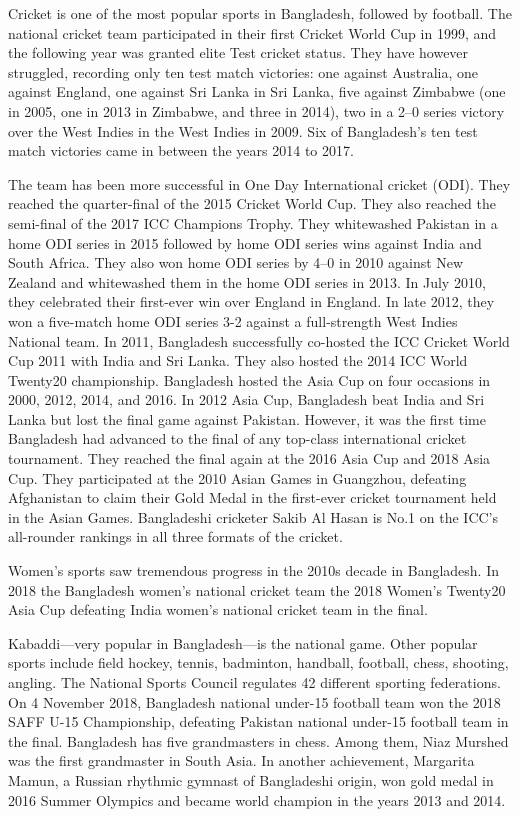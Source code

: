 Cricket is one of the most popular sports in Bangladesh, followed by
football. The national cricket team participated in their first Cricket
World Cup in 1999, and the following year was granted elite Test cricket
status. They have however struggled, recording only ten test match
victories: one against Australia, one against England, one against Sri
Lanka in Sri Lanka, five against Zimbabwe (one in 2005, one in 2013 in
Zimbabwe, and three in 2014), two in a 2--0 series victory over the West
Indies in the West Indies in 2009. Six of Bangladesh's ten test match
victories came in between the years 2014 to 2017.

The team has been more successful in One Day International cricket
(ODI). They reached the quarter-final of the 2015 Cricket World Cup.
They also reached the semi-final of the 2017 ICC Champions Trophy. They
whitewashed Pakistan in a home ODI series in 2015 followed by home ODI
series wins against India and South Africa. They also won home ODI
series by 4--0 in 2010 against New Zealand and whitewashed them in the
home ODI series in 2013. In July 2010, they celebrated their first-ever
win over England in England. In late 2012, they won a five-match home
ODI series 3-2 against a full-strength West Indies National team. In
2011, Bangladesh successfully co-hosted the ICC Cricket World Cup 2011
with India and Sri Lanka. They also hosted the 2014 ICC World Twenty20
championship. Bangladesh hosted the Asia Cup on four occasions in 2000,
2012, 2014, and 2016. In 2012 Asia Cup, Bangladesh beat India and Sri
Lanka but lost the final game against Pakistan. However, it was the
first time Bangladesh had advanced to the final of any top-class
international cricket tournament. They reached the final again at the
2016 Asia Cup and 2018 Asia Cup. They participated at the 2010 Asian
Games in Guangzhou, defeating Afghanistan to claim their Gold Medal in
the first-ever cricket tournament held in the Asian Games. Bangladeshi
cricketer Sakib Al Hasan is No.1 on the ICC's all-rounder rankings in
all three formats of the cricket.

Women's sports saw tremendous progress in the 2010s decade in
Bangladesh. In 2018 the Bangladesh women's national cricket team the
2018 Women's Twenty20 Asia Cup defeating India women's national cricket
team in the final.

Kabaddi---very popular in Bangladesh---is the national game. Other
popular sports include field hockey, tennis, badminton, handball,
football, chess, shooting, angling. The National Sports Council
regulates 42 different sporting federations. On 4 November 2018,
Bangladesh national under-15 football team won the 2018 SAFF U-15
Championship, defeating Pakistan national under-15 football team in the
final. Bangladesh has five grandmasters in chess. Among them, Niaz
Murshed was the first grandmaster in South Asia. In another achievement,
Margarita Mamun, a Russian rhythmic gymnast of Bangladeshi origin, won
gold medal in 2016 Summer Olympics and became world champion in the
years 2013 and 2014.

